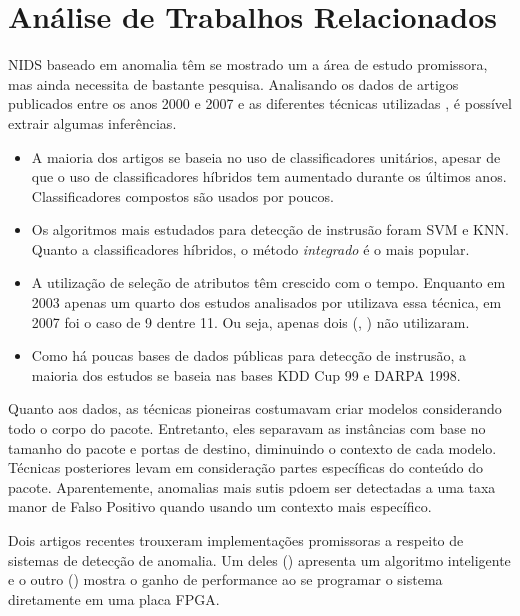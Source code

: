 \chapter{Análise de Trabalhos Relacionados}
\label{chap:analise}

NIDS baseado em anomalia têm se mostrado um a área de estudo promissora, mas ainda necessita de bastante pesquisa.
Analisando os dados de artigos publicados entre os anos 2000 e 2007 e as diferentes técnicas utilizadas \cite{tsai09},
é possível extrair algumas inferências.
\begin{itemize}
    \item  A maioria dos artigos se baseia no uso de classificadores unitários, apesar de que o uso de
    classificadores híbridos tem aumentado durante os últimos anos. Classificadores compostos são usados por poucos.

    \item Os algoritmos mais estudados para detecção de instrusão foram SVM e KNN. Quanto a classificadores híbridos,
    o método \textit{integrado} é o mais popular.

    \item A utilização de seleção de atributos têm crescido com o tempo. Enquanto em 2003 apenas um quarto dos estudos analisados
por \cite{tsai09} utilizava essa técnica, em 2007 foi o caso de 9 dentre 11. Ou seja, apenas dois
(\cite{peddabachigari07}, \cite{li07}) não utilizaram.

    \item Como há poucas bases de dados públicas para detecção de instrusão, a maioria dos estudos se baseia nas
    bases KDD Cup 99 e DARPA 1998.
\end{itemize}

\par Quanto aos dados, as técnicas pioneiras costumavam criar modelos considerando todo o corpo do pacote. Entretanto,
eles separavam as instâncias com base no tamanho do pacote e portas de destino, diminuindo o contexto de cada modelo.
Técnicas posteriores levam em consideração partes específicas do conteúdo do pacote. Aparentemente, anomalias mais
sutis pdoem ser detectadas a uma taxa manor de Falso Positivo quando usando um contexto mais específico.
\par Dois artigos recentes trouxeram implementações promissoras a respeito de sistemas de detecção de
anomalia. Um deles (\cite{lin12}) apresenta um algoritmo inteligente e o outro (\cite{papadonikolakis12}) mostra o
ganho de performance ao se programar o sistema diretamente em uma placa FPGA.

